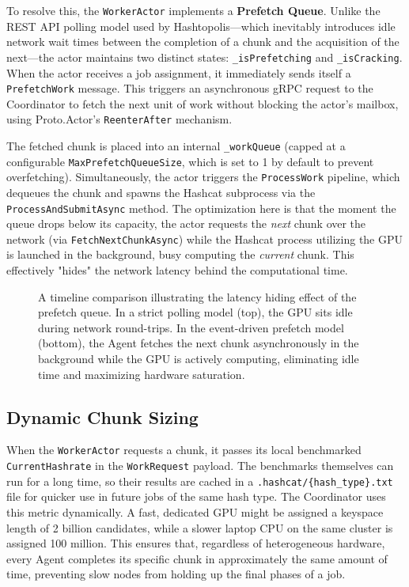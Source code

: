 To resolve this, the \verb|WorkerActor| implements a \textbf{Prefetch Queue}. Unlike the REST API polling model used by Hashtopolis—which inevitably introduces idle network wait times between the completion of a chunk and the acquisition of the next—the actor maintains two distinct states: \verb|_isPrefetching| and \verb|_isCracking|. When the actor receives a job assignment, it immediately sends itself a \verb|PrefetchWork| message. This triggers an asynchronous gRPC request to the Coordinator to fetch the next unit of work without blocking the actor's mailbox, using Proto.Actor's \verb|ReenterAfter| mechanism. 

The fetched chunk is placed into an internal \verb|_workQueue| (capped at a configurable \verb|MaxPrefetchQueueSize|, which is set to 1 by default to prevent overfetching). Simultaneously, the actor triggers the \verb|ProcessWork| pipeline, which dequeues the chunk and spawns the Hashcat subprocess via the \verb|ProcessAndSubmitAsync| method. The optimization here is that the moment the queue drops below its capacity, the actor requests the \textit{next} chunk over the network (via \verb|FetchNextChunkAsync|) while the Hashcat process utilizing the GPU is launched in the background, busy computing the \textit{current} chunk. This effectively "hides" the network latency behind the computational time.

\begin{figure}[H]
\centering

\caption{A timeline comparison illustrating the latency hiding effect of the prefetch queue. In a strict polling model (top), the GPU sits idle during network round-trips. In the event-driven prefetch model (bottom), the Agent fetches the next chunk asynchronously in the background while the GPU is actively computing, eliminating idle time and maximizing hardware saturation.}
\label{fig:latency_hiding_timeline}
\end{figure}

\subsection{Dynamic Chunk Sizing}
\label{sec:dynamic_chunk_sizing}
When the \verb|WorkerActor| requests a chunk, it passes its local benchmarked \verb|CurrentHashrate| in the \verb|WorkRequest| payload. The benchmarks themselves can run for a long time, so their results are cached in a \verb|.hashcat/{hash_type}.txt| file for quicker use in future jobs of the same hash type. The Coordinator uses this metric dynamically. A fast, dedicated GPU might be assigned a keyspace length of 2 billion candidates, while a slower laptop CPU on the same cluster is assigned 100 million. This ensures that, regardless of heterogeneous hardware, every Agent completes its specific chunk in approximately the same amount of time, preventing slow nodes from holding up the final phases of a job.


